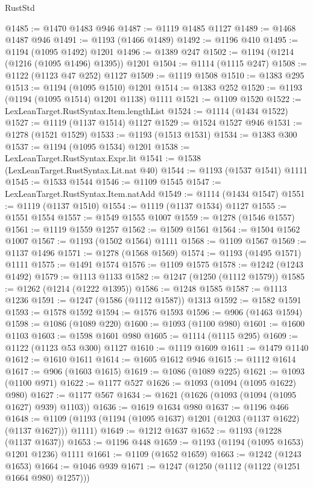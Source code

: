\begin{lexlean}{RustStd}
\begin{coremodule}
{\begin{coremodule}
{{{{{{{{{{{{{{{{{{{{{{{{{{{{{{{@1485 := @1470 @1483 @946
@1487 := @1119 @1485 @1127
@1489 := @1468 @1487 @946
@1491 := @1193 (@1466 @1489)
@1492 := @1196 @410
@1495 := @1194 (@1095 @1492) @1201
@1496 := @1389 @247
@1502 := @1194 (@1214 (@1216 (@1095 @1496) @1395)) @1201
@1504 := @1114 (@1115 @247)
@1508 := @1122 (@1123 @47 @252) @1127
@1509 := @1119 @1508
@1510 := @1383 @295
@1513 := @1194 (@1095 @1510) @1201
@1514 := @1383 @252
@1520 := @1193 (@1194 (@1095 @1514) @1201 @1138) @1111
@1521 := @1109 @1520
@1522 := LexLeanTarget.RustSyntax.Item.lengthList
@1524 := @1114 (@1434 @1522)
@1527 := @1119 (@1137 @1514) @1127
@1529 := @1524 @1527 @946
@1531 := @1278 (@1521 @1529)
@1533 := @1193 (@1513 @1531)
@1534 := @1383 @300
@1537 := @1194 (@1095 @1534) @1201
@1538 := LexLeanTarget.RustSyntax.Expr.lit
@1541 := @1538 (LexLeanTarget.RustSyntax.Lit.nat @40)
@1544 := @1193 (@1537 @1541) @1111
@1545 := @1533 @1544
@1546 := @1109 @1545
@1547 := LexLeanTarget.RustSyntax.Item.natAdd
@1549 := @1114 (@1434 @1547)
@1551 := @1119 (@1137 @1510)
@1554 := @1119 (@1137 @1534) @1127
@1555 := @1551 @1554
@1557 := @1549 @1555 @1007
@1559 := @1278 (@1546 @1557)
@1561 := @1119 @1559 @1257
@1562 := @1509 @1561
@1564 := @1504 @1562 @1007
@1567 := @1193 (@1502 @1564) @1111
@1568 := @1109 @1567
@1569 := @1137 @1496
@1571 := @1278 (@1568 @1569)
@1574 := @1193 (@1495 @1571) @1111
@1575 := @1491 @1574
@1576 := @1109 @1575
@1578 := @1242 (@1243 @1492)
@1579 := @1113 @1133
@1582 := @1247 (@1250 (@1112 @1579))
@1585 := @1262 (@1214 (@1222 @1395))
@1586 := @1248 @1585
@1587 := @1113 @1236
@1591 := @1247 (@1586 (@1112 @1587)) @1313
@1592 := @1582 @1591
@1593 := @1578 @1592
@1594 := @1576 @1593
@1596 := @906 (@1463 @1594)
@1598 := @1086 (@1089 @220)
@1600 := @1093 (@1100 @980)
@1601 := @1600 @1103
@1603 := @1598 @1601 @980
@1605 := @1114 (@1115 @295)
@1609 := @1122 (@1123 @53 @300) @1127
@1610 := @1119 @1609
@1611 := @1479 @1140
@1612 := @1610 @1611
@1614 := @1605 @1612 @946
@1615 := @1112 @1614
@1617 := @906 (@1603 @1615)
@1619 := @1086 (@1089 @225)
@1621 := @1093 (@1100 @971)
@1622 := @1177 @527
@1626 := @1093 (@1094 (@1095 @1622) @980)
@1627 := @1177 @567
@1634 := @1621 (@1626 (@1093 (@1094 (@1095 @1627) @939) @1103))
@1636 := @1619 @1634 @980
@1637 := @1196 @466
@1648 := @1109 (@1193 (@1194 (@1095 @1637) @1201 (@1203 (@1137 @1622) (@1137 @1627))) @1111)
@1649 := @1212 @1637
@1652 := @1193 (@1228 (@1137 @1637))
@1653 := @1196 @448
@1659 := @1193 (@1194 (@1095 @1653) @1201 @1236) @1111
@1661 := @1109 (@1652 @1659)
@1663 := @1242 (@1243 @1653)
@1664 := @1046 @939
@1671 := @1247 (@1250 (@1112 (@1122 (@1251 @1664 @980) @1257)))
}}}}}}}}}}}}}}}}}}}}}}}}}}}}}}}
\end{coremodule}}
\end{coremodule}
\end{lexlean}
